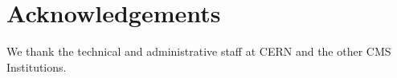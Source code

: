 \section{Acknowledgements}

We thank the technical and administrative staff at CERN and the other CMS Institutions.
